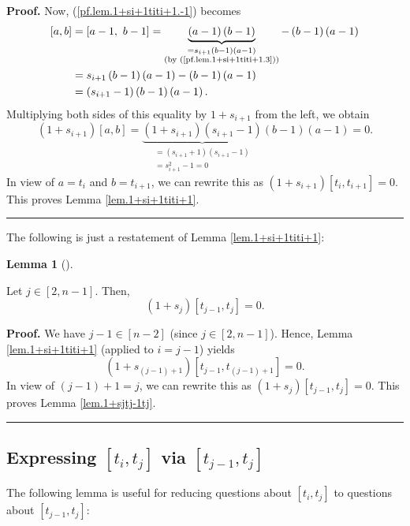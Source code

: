 \documentclass[numbers=enddot,12pt,final,onecolumn,notitlepage]{scrartcl}%
\theoremstyle{definition}
\newtheorem{lem}[theo]{Lemma}
\newenvironment{lemma}[1][]
{\begin{lem}[#1]\begin{leftbar}}
{\end{leftbar}\end{lem}}
\newenvironment{proof}[1][Proof]{\noindent\textbf{#1.} }{\ \rule{0.5em}{0.5em}}
\begin{document}
\begin{proof}
Now, (\ref{pf.lem.1+si+1titi+1.-1}) becomes%
\begin{align*}
\left[  a,b\right]   &  =\left[  a-1,\ b-1\right]  =\underbrace{\left(
a-1\right)  \left(  b-1\right)  }_{\substack{=s_{i+1}\left(  b-1\right)
\left(  a-1\right)  \\\text{(by (\ref{pf.lem.1+si+1titi+1.3}))}}}-\left(
b-1\right)  \left(  a-1\right) \\
&  =s_{i+1}\left(  b-1\right)  \left(  a-1\right)  -\left(  b-1\right)
\left(  a-1\right) \\
&  =\left(  s_{i+1}-1\right)  \left(  b-1\right)  \left(  a-1\right)  .
\end{align*}
Multiplying both sides of this equality by $1+s_{i+1}$ from the left, we
obtain%
\[
\left(  1+s_{i+1}\right)  \left[  a,b\right]  =\underbrace{\left(
1+s_{i+1}\right)  \left(  s_{i+1}-1\right)  }_{\substack{=\left(
s_{i+1}+1\right)  \left(  s_{i+1}-1\right)  \\=s_{i+1}^{2}-1=0}}\left(
b-1\right)  \left(  a-1\right)  =0.
\]
In view of $a=t_{i}$ and $b=t_{i+1}$, we can rewrite this as $\left(
1+s_{i+1}\right)  \left[  t_{i},t_{i+1}\right]  =0$. This proves Lemma
\ref{lem.1+si+1titi+1}.
\end{proof}

The following is just a restatement of Lemma \ref{lem.1+si+1titi+1}:

\begin{lemma}
\label{lem.1+sjtj-1tj}Let $j\in\left[  2,n-1\right]  $. Then,%
\[
\left(  1+s_{j}\right)  \left[  t_{j-1},t_{j}\right]  =0.
\]

\end{lemma}

\begin{proof}
We have $j-1\in\left[  n-2\right]  $ (since $j\in\left[  2,n-1\right]  $).
Hence, Lemma \ref{lem.1+si+1titi+1} (applied to $i=j-1$) yields%
\[
\left(  1+s_{\left(  j-1\right)  +1}\right)  \left[  t_{j-1},t_{\left(
j-1\right)  +1}\right]  =0.
\]
In view of $\left(  j-1\right)  +1=j$, we can rewrite this as $\left(
1+s_{j}\right)  \left[  t_{j-1},t_{j}\right]  =0$. This proves Lemma
\ref{lem.1+sjtj-1tj}.
\end{proof}

\subsection{Expressing $\left[  t_{i},t_{j}\right]  $ via $\left[
t_{j-1},t_{j}\right]  $}

The following lemma is useful for reducing questions about $\left[
t_{i},t_{j}\right]  $ to questions about $\left[  t_{j-1},t_{j}\right]  $:
\end{document}
